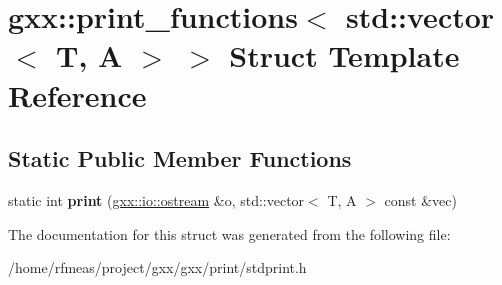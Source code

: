 \hypertarget{structgxx_1_1print__functions_3_01std_1_1vector_3_01T_00_01A_01_4_01_4}{}\section{gxx\+:\+:print\+\_\+functions$<$ std\+:\+:vector$<$ T, A $>$ $>$ Struct Template Reference}
\label{structgxx_1_1print__functions_3_01std_1_1vector_3_01T_00_01A_01_4_01_4}
\subsection*{Static Public Member Functions}
\begin{DoxyCompactItemize}
\item 
static int {\bfseries print} (\hyperlink{classgxx_1_1io_1_1ostream}{gxx\+::io\+::ostream} \&o, std\+::vector$<$ T, A $>$ const \&vec)\hypertarget{structgxx_1_1print__functions_3_01std_1_1vector_3_01T_00_01A_01_4_01_4_a1dc493cb7f3130e5ee07bb6a5b390d6d}{}\label{structgxx_1_1print__functions_3_01std_1_1vector_3_01T_00_01A_01_4_01_4_a1dc493cb7f3130e5ee07bb6a5b390d6d}

\end{DoxyCompactItemize}


The documentation for this struct was generated from the following file\+:\begin{DoxyCompactItemize}
\item 
/home/rfmeas/project/gxx/gxx/print/stdprint.\+h\end{DoxyCompactItemize}
